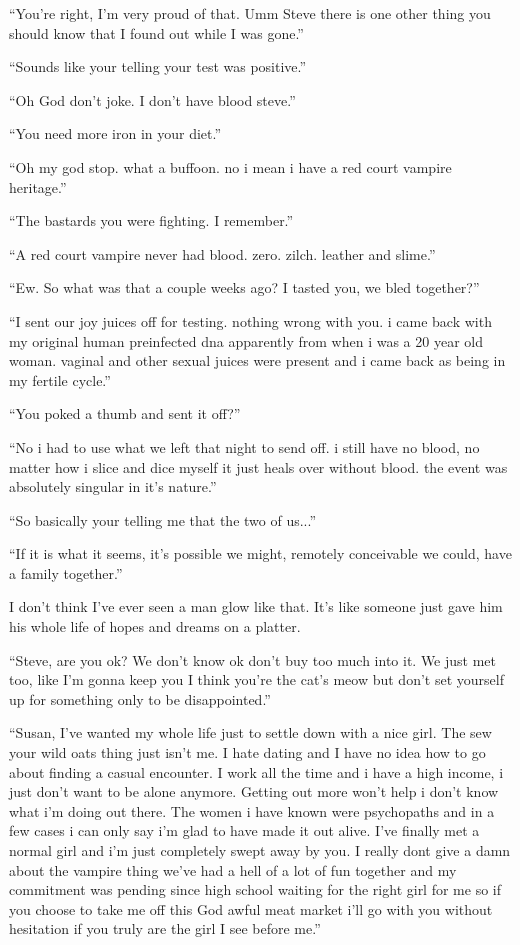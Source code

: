 ``You're right, I'm very proud of that. Umm Steve there is one other thing you should know that I found out while I was gone.''

``Sounds like your telling your test was positive.''

``Oh God don't joke. I don't have blood steve.''

``You need more iron in your diet.''

``Oh my god stop. what a buffoon. no i mean i have a red court vampire heritage.''

``The bastards you were fighting. I remember.''

``A red court vampire never had blood. zero. zilch. leather and slime.''

``Ew. So what was that a couple weeks ago? I tasted you, we bled together?''

``I sent our joy juices off for testing. nothing wrong with you. i came back with my original human preinfected dna apparently from when i was a 20 year old woman. vaginal and other sexual juices were present and i came back as being in my fertile cycle.''

``You poked a thumb and sent it off?''

``No i had to use what we left that night to send off. i still have no blood, no matter how i slice and dice myself it just heals over without blood. the event was absolutely singular in it's nature.''

``So basically your telling me that the two of us...''

``If it is what it seems, it's possible we might, remotely conceivable we could, have a family together.''

I don't think I've ever seen a man glow like that. It's like someone just gave him his whole life of hopes and dreams on a platter.

``Steve, are you ok? We don't know ok don't buy too much into it. We just met too, like I'm gonna keep you I think you're the cat's meow but don't set yourself up for something only to be disappointed.''

``Susan, I've wanted my whole life just to settle down with a nice girl. The sew your wild oats thing just isn't me. I hate dating and I have no idea how to go about finding a casual encounter. I work all the time and i have a high income,  i just don't want to be alone anymore. Getting out more won't help i don't know what i'm doing out there. The women i have known were psychopaths and in a few cases i can only say i'm glad to have made it out alive. I've finally met a normal girl and i'm just completely swept away by you. I really dont give a damn about the vampire thing we've had a hell of a lot of fun together and my commitment was pending since high school waiting for the right girl for me so if you choose to take me off this God awful meat market i'll go with you without hesitation if you truly are the girl I see before me.''

